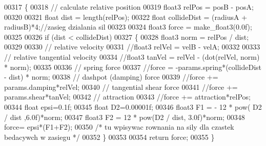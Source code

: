 \begin{DoxyCode}
00317 \{
00318     \textcolor{comment}{// calculate relative position}
00319     float3 relPos = posB - posA;
00320 
00321     \textcolor{keywordtype}{float} dist = length(relPos);
00322     \textcolor{keywordtype}{float} collideDist = (radiusA + radiusB)*4;\textcolor{comment}{//zasieg dzialania sil}
00323 
00324     float3 force = make\_float3(0.0f);
00325 
00326     \textcolor{keywordflow}{if} (dist < collideDist)
00327     \{
00328         float3 norm = relPos / dist;
00329 
00330         \textcolor{comment}{// relative velocity}
00331         \textcolor{comment}{//float3 relVel = velB - velA;}
00332 
00333         \textcolor{comment}{// relative tangential velocity}
00334         \textcolor{comment}{//float3 tanVel = relVel - (dot(relVel, norm) * norm);}
00335 
00336         \textcolor{comment}{// spring force}
00337         \textcolor{comment}{//force = -params.spring*(collideDist - dist) * norm;}
00338         \textcolor{comment}{// dashpot (damping) force}
00339         \textcolor{comment}{//force += params.damping*relVel;}
00340         \textcolor{comment}{// tangential shear force}
00341         \textcolor{comment}{//force += params.shear*tanVel;}
00342         \textcolor{comment}{// attraction}
00343         \textcolor{comment}{//force += attraction*relPos;}
00344                 \textcolor{keywordtype}{float} epsi=0.1f;
00345                 \textcolor{keywordtype}{float} D2=0.00001f;
00346                 float3 F1 = - 12 * pow( D2 /  dist ,6.0f)*norm;
00347                 float3 F2 = 12 * pow(D2 / dist, 3.0f)*norm;
00348                 force= epsi*(F1+F2);
00350 \textcolor{comment}{/*      tu wpisywac rownania na sily dla czastek bedacywch w zasiegu    */}
00352     \}
00353 
00354     \textcolor{keywordflow}{return} force;
00355 \}
\end{DoxyCode}
